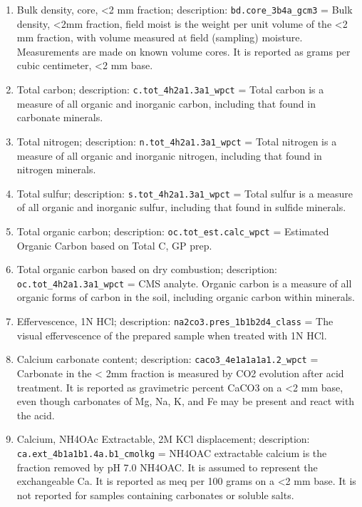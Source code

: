 \documentclass[
  graybox,natbib,nospthms]{svmono}
\begin{document}
\begin{enumerate}
\item
  Bulk density, core, \textless2 mm fraction; description: \texttt{bd.core\_3b4a\_gcm3} = Bulk density, \textless2mm fraction, field moist is the weight per unit volume of the \textless2 mm fraction, with volume measured at field (sampling) moisture. Measurements are made on known volume cores. It is reported as grams per cubic centimeter, \textless2 mm base.\\
\item
  Total carbon; description: \texttt{c.tot\_4h2a1.3a1\_wpct} = Total carbon is a measure of all organic and inorganic carbon, including that found in carbonate minerals.\\
\item
  Total nitrogen; description: \texttt{n.tot\_4h2a1.3a1\_wpct} = Total nitrogen is a measure of all organic and inorganic nitrogen, including that found in nitrogen minerals.\\
\item
  Total sulfur; description: \texttt{s.tot\_4h2a1.3a1\_wpct} = Total sulfur is a measure of all organic and inorganic sulfur, including that found in sulfide minerals.\\
\item
  Total organic carbon; description: \texttt{oc.tot\_est.calc\_wpct} = Estimated Organic Carbon based on Total C, GP prep.\\
\item
  Total organic carbon based on dry combustion; description: \texttt{oc.tot\_4h2a1.3a1\_wpct} = CMS analyte. Organic carbon is a measure of all organic forms of carbon in the soil, including organic carbon within minerals.
\item
  Effervescence, 1N HCl; description: \texttt{na2co3.pres\_1b1b2d4\_class} = The visual effervescence of the prepared sample when treated with 1N HCl.\\
\item
  Calcium carbonate content; description: \texttt{caco3\_4e1a1a1a1.2\_wpct} = Carbonate in the \textless{} 2mm fraction is measured by CO2 evolution after acid treatment. It is reported as gravimetric percent CaCO3 on a \textless2 mm base, even though carbonates of Mg, Na, K, and Fe may be present and react with the acid.\\
\item
  Calcium, NH4OAc Extractable, 2M KCl displacement; description: \texttt{ca.ext\_4b1a1b1.4a.b1\_cmolkg} = NH4OAC extractable calcium is the fraction removed by pH 7.0 NH4OAC. It is assumed to represent the exchangeable Ca. It is reported as meq per 100 grams on a \textless2 mm base. It is not reported for samples containing carbonates or soluble salts.\\

\end{enumerate}
\end{document}
